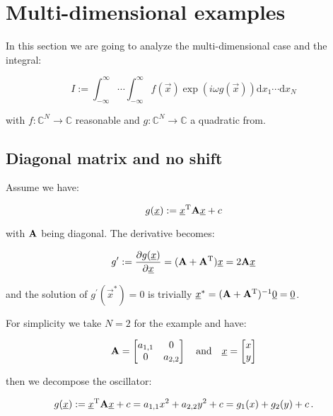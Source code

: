\documentclass[a4paper,10pt]{article}
\begin{document}
\section{Multi-dimensional examples}

In this section we are going to analyze the multi-dimensional case
and the integral:

\begin{equation} \label{eq:mv_integral}
 I := \int_{-\infty}^{\infty} \cdots \int_{-\infty}^{\infty} f(\vec{x}) \exp(i \omega g(\vec{x})) \mathrm{d}x_1 \cdots \mathrm{d}x_N
\end{equation}

with $f:\mathbb{C}^N \rightarrow \mathbb{C}$ reasonable and $g:\mathbb{C}^N \rightarrow \mathbb{C}$
a quadratic from.


\subsection{Diagonal matrix and no shift}
\label{sec:mv_diag_nlt}

Assume we have:

\begin{equation}
 g(\underline{x}) := \underline{x}{}^{\textnormal{T}} \mathbf{A} \underline{x} + c
\end{equation}

with $\mathbf{A}$ being diagonal. The derivative becomes:

\begin{equation}
 g^\prime := \frac{\partial g(\underline{x})}{\partial \underline{x}} = (\mathbf{A}+\mathbf{A}{}^{\textnormal{T}}) \underline{x} = 2 \mathbf{A} \underline{x}
\end{equation}

and the solution of $g^\prime(\vec{x}^{*}) = 0$ is trivially $\underline{x}^{*} = (\mathbf{A}+\mathbf{A}{}^{\textnormal{T}}){}^{-1} \underline{0} = \underline{0}$.

For simplicity we take $N=2$ for the example and have:

\begin{equation}
 \mathbf{A} =
 \begin{bmatrix}
  a_{1,1} & 0 \\ 0 & a_{2,2}
 \end{bmatrix}
 \quad \mathrm{and} \quad
 \underline{x} =
 \begin{bmatrix}
  x \\ y
 \end{bmatrix}
\end{equation}

then we decompose the oscillator:

\begin{equation}
 g(\underline{x}) := \underline{x}{}^{\textnormal{T}} \mathbf{A} \underline{x} + c = a_{1,1} x^2 + a_{2,2} y^2 + c = g_1(x) + g_2(y) + c \,.
\end{equation}
\end{document}
